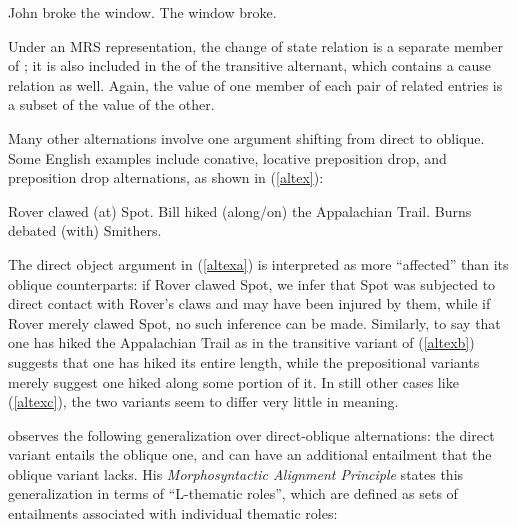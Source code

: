 \documentclass[output=paper
	        ,collection
	        ,collectionchapter
 	        ,biblatex
                ,babelshorthands
                ,newtxmath
                ,draftmode
                ,colorlinks, citecolor=brown
]{langscibook}
\begin{document}
\begin{exe}
\ex\label{caus-inch}
\begin{xlist}
	\ex\label{caus-inch-a}John broke the window.
	\ex\label{caus-inch-b}The window broke.
\end{xlist}	
\end{exe}

Under an MRS representation, the change of state relation is a separate member of \rels; it is also included in the \rels of the transitive alternant, which contains a cause relation as well.
Again, the \rels value of one member of each pair of related entries is a subset of the \rels value of the other.

Many other alternations involve one argument shifting from direct to oblique.
Some English examples include conative, locative preposition drop, and  preposition drop alternations, as shown in (\ref{altex}):

\begin{exe}\ex\label{altex}
\begin{xlist}
\ex \label{altexa} Rover clawed (at) Spot. 
\ex \label{altexb} Bill hiked (along/on) the Appalachian Trail.
\ex \label{altexc} Burns debated (with) Smithers.
\end{xlist}
\end{exe}

\noindent
The direct object argument in (\ref{altexa}) is interpreted as more ``affected'' than its oblique counterparts:  if Rover clawed Spot, we infer that Spot was subjected to direct contact with Rover's claws and may have been injured by them, while if Rover merely clawed  Spot, no such inference can be made.
Similarly, to say that one has hiked the Appalachian Trail as in the transitive variant of (\ref{altexb}) suggests that one has hiked its entire length, while the prepositional variants merely suggest one hiked along some portion of it.  In still other cases like (\ref{altexc}), the two variants seem to differ very little in meaning.  


\citet{Beavers2010} observes the following generalization over direct-oblique alternations:  the direct variant entails the oblique one, and can have an additional entailment that the oblique variant lacks.  
His \emph{Morphosyntactic Alignment Principle}  states this generalization in terms of ``L-thematic roles'', which are defined as sets of entailments associated with individual thematic roles:   
\end{document}
